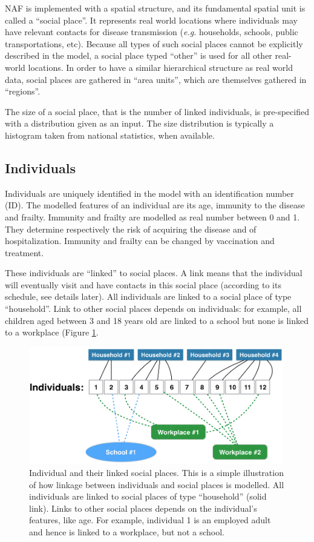 \documentclass[11pt, onecolumn]{article}
\newcommand{\eg}{\textit{e.g.}\xspace}
\newcommand{\naf}{\textsf{NAF}\xspace}
\begin{document}
\naf is implemented with a spatial structure, and its fundamental spatial unit is called a ``social place''. It represents real world locations where individuals may have relevant contacts for disease transmission (\eg households, schools, public transportations, etc). Because all types of such social places cannot be explicitly described in the model, a social place typed ``other'' is used for all other real-world locations.
In order to have a similar hierarchical structure as real world data, social places are gathered in ``area units'', which are themselves gathered in ``regions''.

The size of a social place, that is the number of linked individuals, is pre-specified with a distribution given as an input. The size distribution is typically a histogram taken from national statistics, when available. 




\subsection{Individuals}

Individuals are uniquely identified in the model with an identification number (ID). The modelled features of an individual are its age, immunity to the disease and frailty. Immunity and frailty are modelled as real number between 0 and 1. They determine respectively the risk of acquiring the disease and of hospitalization. Immunity and frailty can be changed by vaccination and  treatment.

These individuals are ``linked'' to social places. A link means that the individual will eventually visit and have contacts in this social place (according to its schedule, see details later).
All individuals are linked to a social place of type ``household''. Link to other social places depends on individuals: for example, all children aged between 3 and 18 years old are linked to a school but none is linked to a workplace (Figure \ref{fig:SP_indiv}. 


\begin{figure}[!ht]
\centering
    \includegraphics[angle=0,width=0.99\textwidth]{figures/SP_indiv.png}
\caption{Individual and their linked social places. This is a simple illustration of how linkage between individuals and social places is modelled. All individuals are linked to social places of type ``household'' (solid link). Links to other social places depends on the individual's features, like age. For example, individual 1 is an employed adult and hence is linked to a workplace, but not a school.}
\label{fig:SP_indiv}
\end{figure}
\end{document}
